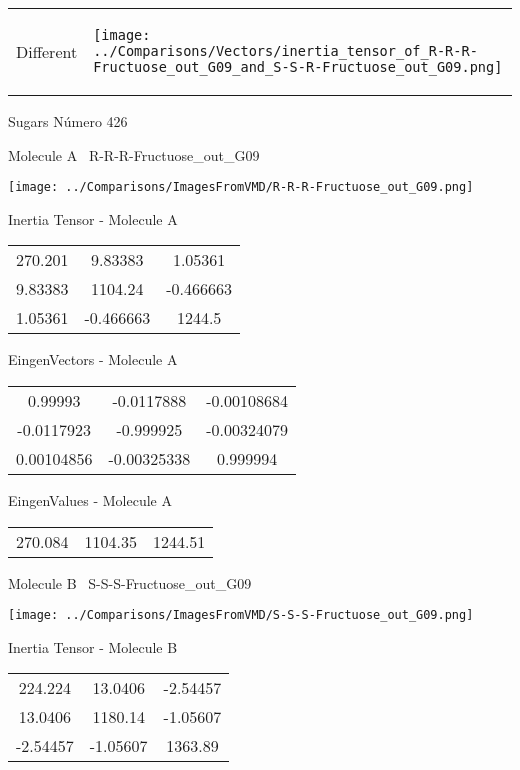\vtab[-5mm]
\begin{tabular}{*{2}{m{}}}
\begin{center}
\textcolor{NavyBlue}{\Large Different}
\end{center}
&
\begin{center}
\texttt{[image: ../Comparisons/Vectors/inertia\_tensor\_of\_R-R-R-Fructuose\_out\_G09\_and\_S-S-R-Fructuose\_out\_G09.png]}
\end{center}
\end{tabular}

 \newpage

\vtab[-3cm]
\begin{center}
{\large Sugars \tab Número 426}
\end{center}
\begin{multicols}{2}
\begin{center}

Molecule A \
R-R-R-Fructuose\_out\_G09

\texttt{[image: ../Comparisons/ImagesFromVMD/R-R-R-Fructuose\_out\_G09.png]}

Inertia Tensor - Molecule A \\
\begin{tabular}{|c c c|}
270.201	 & 	9.83383	 & 	1.05361	 \\
9.83383	 & 	1104.24	 & 	-0.466663	 \\
1.05361	 & 	-0.466663	 & 	1244.5
\end{tabular}

\vtab
 EingenVectors - Molecule A     \\
\begin{tabular}{|c c c|}
0.99993	 & 	-0.0117888	 & 	-0.00108684	 \\
-0.0117923	 & 	-0.999925	 & 	-0.00324079	 \\
0.00104856	 & 	-0.00325338	 & 	0.999994
\end{tabular}

\vtab
 EingenValues - Molecule A     \\
\begin{tabular}{|c c c|}
270.084	 & 	1104.35	 & 	1244.51	 \\
\end{tabular}
\columnbreak

Molecule B \
S-S-S-Fructuose\_out\_G09

\texttt{[image: ../Comparisons/ImagesFromVMD/S-S-S-Fructuose\_out\_G09.png]}

Inertia Tensor - Molecule B \\
\begin{tabular}{|c c c|}
224.224	 & 	13.0406	 & 	-2.54457	 \\
13.0406	 & 	1180.14	 & 	-1.05607	 \\
-2.54457	 & 	-1.05607	 & 	1363.89
\end{tabular}


\end{center}
\end{multicols}
